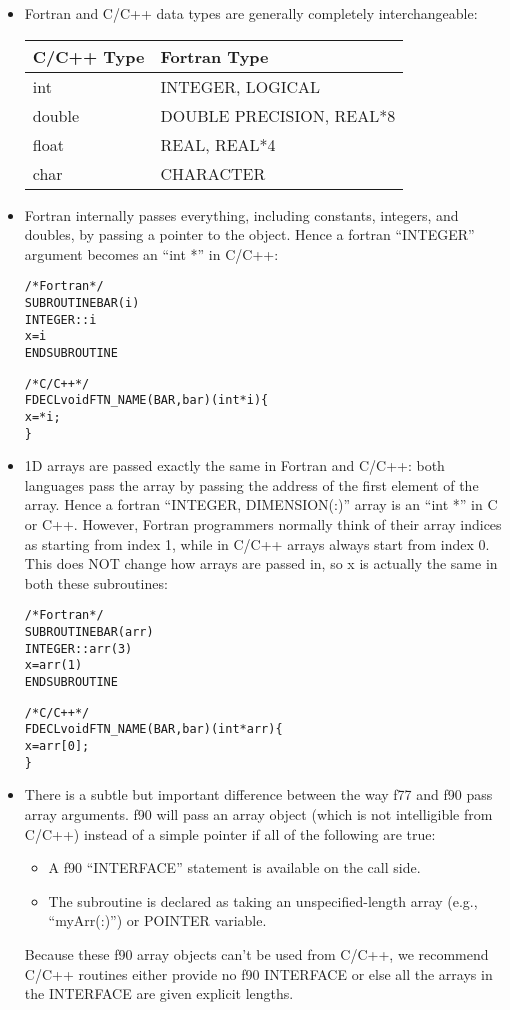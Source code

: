 \begin{itemize}

\item Fortran and C/C++ data types are generally completely
interchangeable:

\begin{tabular}{|l|l|}
\hline
\textbf{C/C++ Type} & \textbf{Fortran Type} \\
\hline
int & INTEGER, LOGICAL \\
double & DOUBLE PRECISION, REAL*8 \\
float & REAL, REAL*4 \\
char & CHARACTER \\
\hline
\end{tabular}

\item Fortran internally passes everything, including 
constants, integers, and doubles, by passing a pointer
to the object.  Hence a fortran ``INTEGER'' argument becomes 
an ``int *'' in C/C++:
\begin{alltt}
/* Fortran */
SUBROUTINE BAR(i) 
    INTEGER :: i
    x=i
END SUBROUTINE

/* C/C++ */
FDECL void FTN\_NAME(BAR,bar)(int *i) \{
    x=*i;
\}
\end{alltt}

\item 1D arrays are passed exactly the same in Fortran and C/C++:
both languages pass the array by passing the address of the 
first element of the array.
Hence a fortran ``INTEGER, DIMENSION(:)'' array is an ``int *''
in C or C++.  However, Fortran programmers normally think of 
their array indices as starting from index 1, while in C/C++ 
arrays always start from index 0.  This does NOT change how 
arrays are passed in, so x is actually the same in both 
these subroutines:
\begin{alltt}
/* Fortran */
SUBROUTINE BAR(arr) 
    INTEGER :: arr(3)
    x=arr(1)
END SUBROUTINE

/* C/C++ */
FDECL void FTN\_NAME(BAR,bar)(int *arr) \{
    x=arr[0];
\}
\end{alltt}

\item There is a subtle but important difference between the way
f77 and f90 pass array arguments.  f90 will pass an array object
(which is not intelligible from C/C++) instead of a simple pointer 
if all of the following are true:
\begin{itemize}
\item A f90 ``INTERFACE'' statement is available on the call side.
\item The subroutine is declared as taking an unspecified-length
       array (e.g., ``myArr(:)'') or POINTER variable.
\end{itemize}
Because these f90 array objects can't be used from C/C++, we recommend 
C/C++ routines either provide no f90 INTERFACE or else all the arrays 
in the INTERFACE are given explicit lengths.


\end{itemize}
